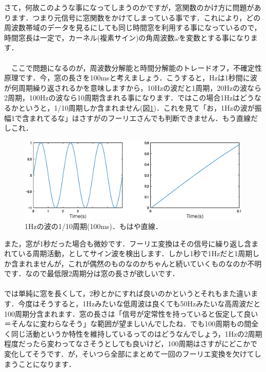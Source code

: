 \documentclass[11pt,a4paper]{ujreport} 	%
\begin{document}
さて，何故このような事になってしまうのかですが，窓関数のかけ方に問題があります．つまり元信号に窓関数をかけてしまっている事です．これにより，どの周波数帯域のデータを見るにしても同じ時間窓を利用する事になっているので，時間窓長は一定で，カーネル(複素サイン)の角周波数$\omega$を変数とする事になります．\\
\\
　ここで問題になるのが，周波数分解能と時間分解能のトレードオフ，不確定性原理です．今，窓の長さを100msと考えましょう．こうすると，Hzは1秒間に波が何周期繰り返されるかを意味しますから，10Hzの波だと1周期，20Hzの波なら2周期，100Hzの波なら10周期含まれる事になります．ではこの場合1Hzはどうなるかというと，1/10周期しか含まれません(図\ref{im:uncertainty})．これを見て「お，1Hzの波が振幅1で含まれてるな」はさすがのフーリエさんでも判断できません．もう直線だしこれ．

\begin{figure}[H]
  \label{im:uncertainty}
  \centering
  \includegraphics[width=12cm]{../figures/uncertainty2.eps}
  \caption{1Hzの波の1/10周期(100ms)．もはや直線．}
\end{figure}

また，窓が1秒だった場合も微妙です．フーリエ変換はその信号に繰り返し含まれている周期活動，としてサイン波を検出します．しかし1秒で1Hzだと1周期しか含まれませんが，これが偶然のものなのかちゃんと続いていくものなのか不明です．なので最低限2周期分は窓の長さが欲しいです．\\\\

では単純に窓を長くして，2秒とかにすれば良いのかというとそれもまた違います．今度はそうすると，1Hzみたいな低周波は良くても50Hzみたいな高周波だと100周期分含まれます．窓の長さは「信号が定常性を持っていると仮定して良い＝そんなに変わらなそう」な範囲が望ましいんでしたね．でも100周期もの間全く同じ活動というか特性を維持しているってのはどうなんでしょう，1Hzの2周期程度だったら変わってなさそうとしても良いけど，100周期はさすがにどこかで変化してそうです．が，そいつら全部にまとめて一回のフーリエ変換を欠けてしまうことになります．\\
\end{document}
